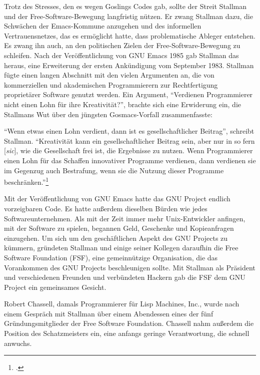 Trotz des Stresses, den es wegen Goslings Codes gab, sollte der Streit Stallman und der Free-Software-Bewegung langfristig nützen. Er zwang Stallman dazu, die Schwächen der Emacs-Kommune anzugehen und des informellen Vertrauensnetzes, das es ermöglicht hatte, dass problematische Ableger entstehen. Es zwang ihn auch, an den politischen Zielen der Free-Software-Bewegung zu schleifen. Nach der Veröffentlichung von GNU Emacs 1985 gab Stallman das  heraus, eine Erweiterung der ersten Ankündigung vom September 1983. Stallman fügte einen langen Abschnitt mit den vielen Argumenten an, die von kommerziellen und akademischen Programmierern zur Rechtfertigung proprietärer Software genutzt werden. Ein Argument, "`Verdienen Programmierer nicht einen Lohn für ihre Kreativität?"', brachte sich eine Erwiderung ein, die Stallmans Wut über den jüngsten Gosmacs-Vorfall zusammenfasste:

"`Wenn etwas einen Lohn verdient, dann ist es gesellschaftlicher Beitrag"', schreibt Stallman. "`Kreativität kann ein gesellschaftlicher Beitrag sein, aber nur in so fern [\textit{sic}], wie die Gesellschaft frei ist, die Ergebnisse zu nutzen. Wenn Programmierer einen Lohn für das Schaffen innovativer Programme verdienen, dann verdienen sie im Gegenzug auch Bestrafung, wenn sie die Nutzung dieser Programme beschränken."'\footcite[Vgl.][]{gnumani}

Mit der Veröffentlichung von GNU Emacs hatte das GNU Project endlich vorzeigbaren Code. Es hatte außerdem dieselben Bürden wie jedes Softwareunternehmen. Als mit der Zeit immer mehr Unix-Entwickler anfingen, mit der Software zu spielen, begannen Geld, Geschenke und Kopieanfragen einzugehen. Um sich um den geschäftlichen Aspekt des GNU Projects zu kümmern, gründeten Stallman und einige seiner Kollegen daraufhin die Free Software Foundation (FSF), eine gemeinnützige Organisation, die das Vorankommen des GNU Projects beschleunigen sollte. Mit Stallman als Präsident und verschiedenen Freunden und verbündeten Hackern gab die FSF dem GNU Project ein gemeinsames Gesicht.

Robert Chassell, damals Programmierer für Lisp Machines, Inc., wurde nach einem Gespräch mit Stallman über einem Abendessen eines der fünf Gründungsmitglieder der Free Software Foundation. Chassell nahm außerdem die Position des Schatzmeisters ein, eine anfangs geringe Verantwortung, die schnell anwuchs.

